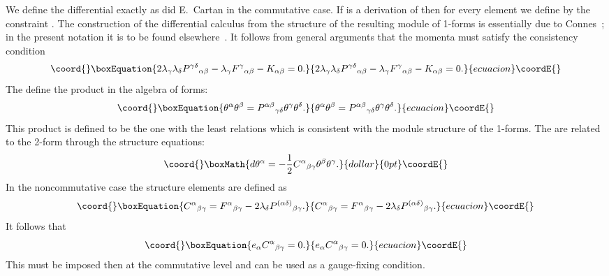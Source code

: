 \documentclass[12pt,a4paper]{article}
\newcounter{eg}
\def\c#1{{\cal #1}}
\def\cn#1{\cite{#1}}
\begin{document}
We define the differential exactly as did E.~Cartan in the commutative
case. If \coordHE{} is a derivation of \myHighlight{$\c{A}$}\coordHE{} then for every element 
\myHighlight{$f \in \c{A}$}\coordHE{} we define \coordHE{} by the constraint 
\coordHE{}. The construction of the differential
calculus from the structure of the resulting module of 1-forms is
essentially due to Connes~\cite{Con94}; in the present notation it is
to be found elsewhere~\cite{Mad00c}.  It follows from general
arguments that the momenta \myHighlight{$\lambda_\alpha$}\coordHE{} must satisfy the
consistency condition~\cn{DimMad96,MadMou98}
\begin{equation}\coord{}\boxEquation{
2 \lambda_\gamma \lambda_\delta P^{\gamma\delta}{}_{\alpha\beta} - 
\lambda_\gamma F^\gamma{}_{\alpha\beta} - 
K_{\alpha\beta} = 0.                                           \label{consis}
}{
2 \lambda_\gamma \lambda_\delta P^{\gamma\delta}{}_{\alpha\beta} - 
\lambda_\gamma F^\gamma{}_{\alpha\beta} - 
K_{\alpha\beta} = 0.                                           }{ecuacion}\coordE{}\end{equation}
The \coordHE{} define the product \myHighlight{$\pi$}\coordHE{} in the
algebra of forms:
\begin{equation}\coord{}\boxEquation{
\theta^\alpha \theta^\beta = P^{\alpha\beta}{}_{\gamma\delta} 
\theta^\gamma \theta^\delta.                                  \label{struc}
}{
\theta^\alpha \theta^\beta = P^{\alpha\beta}{}_{\gamma\delta} 
\theta^\gamma \theta^\delta.                                  }{ecuacion}\coordE{}\end{equation}
This product is defined to be the one with the least relations which
is consistent with the module structure of the 1-forms.  The
\coordHE{} are related to the 2-form \coordHE{}
through the structure equations:
$$\coord{}\boxMath{
d\theta^\alpha = - {1\over 2}C^\alpha{}_{\beta\gamma} 
\theta^\beta \theta^\gamma.
}{dollar}{0pt}\coordE{}$$
In the noncommutative case the structure elements are defined as
\begin{equation}\coord{}\boxEquation{
C^\alpha{}_{\beta\gamma} = F^\alpha{}_{\beta\gamma} - 
2 \lambda_\delta P^{(\alpha\delta)}{}_{\beta\gamma}.              \label{s-e}
}{
C^\alpha{}_{\beta\gamma} = F^\alpha{}_{\beta\gamma} - 
2 \lambda_\delta P^{(\alpha\delta)}{}_{\beta\gamma}.              }{ecuacion}\coordE{}\end{equation}
It follows that
\begin{equation}\coord{}\boxEquation{
e_\alpha C^\alpha{}_{\beta\gamma} = 0.                           \label{fix}
}{
e_\alpha C^\alpha{}_{\beta\gamma} = 0.                           }{ecuacion}\coordE{}\end{equation}
This must be imposed then at the commutative level and can be used as a 
gauge-fixing condition. 
\end{document}
